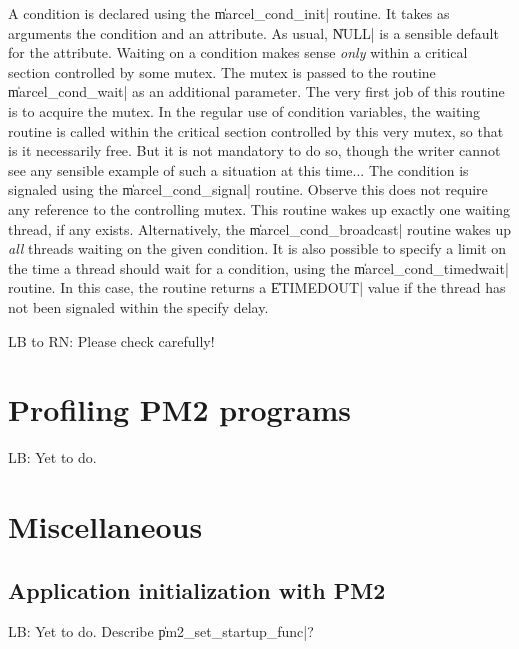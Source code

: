A condition is declared using the \|marcel_cond_init| routine. It
takes as arguments the condition and an attribute. As usual, \|NULL|
is a sensible default for the attribute. Waiting on a condition makes
sense \emph{only} within a critical section controlled by some mutex.
The mutex is passed to the routine \|marcel_cond_wait| as an
additional parameter. The very first job of this routine is to acquire
the mutex. In the regular use of condition variables, the waiting
routine is called within the critical section controlled by this very
mutex, so that is it necessarily free. But it is not mandatory to do
so, though the writer cannot see any sensible example of such a
situation at this time... The condition is signaled using the
\|marcel_cond_signal| routine. Observe this does not require any
reference to the controlling mutex. This routine wakes up exactly one
waiting thread, if any exists. Alternatively, the
\|marcel_cond_broadcast| routine wakes up \emph{all} threads waiting
on the given condition. It is also possible to specify a limit on the
time a thread should wait for a condition, using the
\|marcel_cond_timedwait| routine. In this case, the routine returns a
\|ETIMEDOUT| value if the thread has not been signaled within the
specify delay.

\begin{note}
  LB to RN: Please check carefully!
\end{note}

\section{Profiling PM2 programs}
\label{sec:profiling}

\begin{note}
  LB: Yet to do. 
\end{note}

\section{Miscellaneous}

\subsection{Application initialization with PM2}
\label{sec:startupfunc}

\begin{note}
  LB: Yet to do. Describe \|pm2_set_startup_func|?
\end{note}



